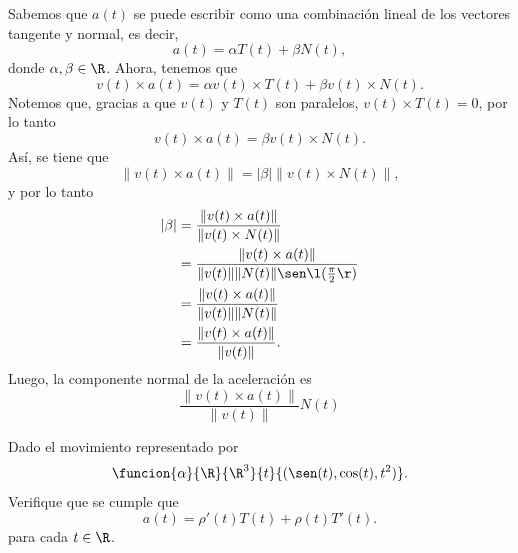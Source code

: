 \documentclass[a4,11pt]{aleph-examen}
\begin{document}
\begin{preguntas}
\begin{respuesta}
    Sabemos que $a(t)$ se puede escribir como una combinación lineal de los vectores tangente y normal, es decir,
    \[
        a(t)=\alpha T(t)+\beta N(t),
    \]
    donde $\alpha,\beta\in\R$.
    Ahora, tenemos que
    \[
        v(t)\times a(t)=\alpha v(t)\times T(t)+\beta v(t)\times N(t).
    \]
    Notemos que, gracias a que $v(t)$ y $T(t)$ son paralelos, $v(t)\times T(t)=0$, por lo tanto
    \[
        v(t)\times a(t)=\beta v(t)\times N(t).
    \]
    Así, se tiene que
    \[
         \| v(t)\times a(t) \| = |\beta| \| v(t)\times N(t) \|,
    \]
    y por lo tanto
    \begin{align*}
        |\beta| 
            & = \frac{\| v(t)\times a(t) \|}{\| v(t)\times N(t) \|} \\
            & = \frac{\| v(t)\times a(t) \|}{\| v(t) \| \| N(t) \| \sen\l(\frac{\pi}{2}\r)} \\
            & = \frac{\| v(t)\times a(t) \|}{\| v(t) \| \| N(t) \|}\\
            & = \frac{\| v(t)\times a(t) \|}{\| v(t) \|}.
    \end{align*}
    Luego, la componente normal de la aceleración es
    \[
        \frac{\| v(t)\times a(t) \|}{\| v(t) \|} N(t)
    \]
\end{respuesta}

\item 
    Dado el movimiento representado por 
	\[
		\funcion{\alpha}{\R}{\R^3}{t}{(\sen(t),\cos(t),t^2)}.
	\]
	Verifique que se cumple que
	\[
        a(t)=\rho'(t) T(t)+\rho(t) T' (t).
	\]
	para cada $t\in\R$.


\end{preguntas}
\end{document}

